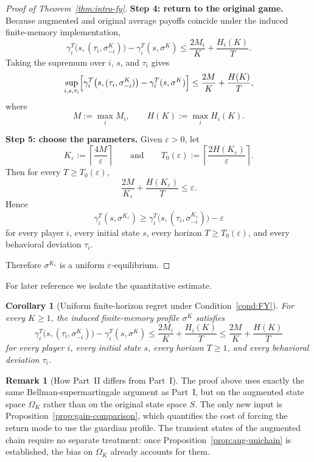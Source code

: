 \documentclass[11pt]{article}
\newtheorem{corollary}[theorem]{Corollary}
\theoremstyle{definition}
\newtheorem{remark}[theorem]{Remark}
\newcommand{\1}{\mathbf{1}}
\begin{document}
\begin{proof}[Proof of Theorem~\ref{thm:intro-fy}]
\smallskip
\noindent
\textbf{Step 4: return to the original game.}
Because augmented and original average payoffs coincide under the induced finite-memory implementation,
\[
\gamma_i^T\bigl(s,(\tau_i,\sigma_{-i}^K)\bigr)-\gamma_i^T(s,\sigma^K)
\le
\frac{2M_i}{K}+\frac{H_i(K)}{T}.
\]
Taking the supremum over $i$, $s$, and $\tau_i$ gives
\[
\sup_{i,s,\tau_i}
\Bigl[\gamma_i^T\bigl(s,(\tau_i,\sigma_{-i}^K)\bigr)-\gamma_i^T(s,\sigma^K)\Bigr]
\le
\frac{2M}{K}+\frac{H(K)}{T},
\]
where
\[
M:=\max_i M_i,
\qquad
H(K):=\max_i H_i(K).
\]

\smallskip
\noindent
\textbf{Step 5: choose the parameters.}
Given $\varepsilon>0$, let
\[
K_\varepsilon:=\left\lceil \frac{4M}{\varepsilon}\right\rceil
\qquad\text{and}\qquad
T_0(\varepsilon):=\left\lceil \frac{2H(K_\varepsilon)}{\varepsilon}\right\rceil.
\]
Then for every $T\ge T_0(\varepsilon)$,
\[
\frac{2M}{K_\varepsilon}+\frac{H(K_\varepsilon)}{T}
\le \varepsilon.
\]
Hence
\[
\gamma_i^T(s,\sigma^{K_\varepsilon})
\ge
\gamma_i^T\bigl(s,(\tau_i,\sigma_{-i}^{K_\varepsilon})\bigr)-\varepsilon
\]
for every player $i$, every initial state $s$, every horizon $T\ge T_0(\varepsilon)$, and every behavioral deviation $\tau_i$.

Therefore $\sigma^{K_\varepsilon}$ is a uniform $\varepsilon$-equilibrium.
\end{proof}

For later reference we isolate the quantitative estimate.

\begin{corollary}[Uniform finite-horizon regret under Condition~\ref{cond:FY}]\label{cor:fy-regret}
For every $K\ge1$, the induced finite-memory profile $\sigma^K$ satisfies
\[
\gamma_i^T\bigl(s,(\tau_i,\sigma_{-i}^K)\bigr)-\gamma_i^T(s,\sigma^K)
\le
\frac{2M_i}{K}+\frac{H_i(K)}{T}
\le
\frac{2M}{K}+\frac{H(K)}{T}
\]
for every player $i$, every initial state $s$, every horizon $T\ge1$, and every behavioral deviation $\tau_i$.
\end{corollary}

\begin{remark}[How Part~II differs from Part~I]
The proof above uses exactly the same Bellman-supermartingale argument as Part~I, but on the augmented state space $\Omega_K$ rather than on the original state space $S$. The only new input is Proposition~\ref{prop:gain-comparison}, which quantifies the cost of forcing the return mode to use the guardian profile. The transient states of the augmented chain require no separate treatment: once Proposition~\ref{prop:aug-unichain} is established, the bias on $\Omega_K$ already accounts for them.
\end{remark}
\end{document}
